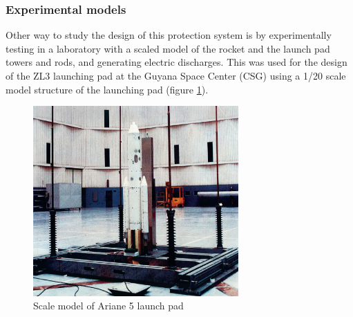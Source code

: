 \subsubsection{Experimental models}

Other way to study the design of this protection system is by experimentally testing
in a laboratory with a scaled model of the rocket and the launch pad towers and
rods, and generating electric discharges. This was used for the design of the ZL3
launching pad at the Guyana Space Center (CSG) using a 1/20 scale model structure
of the launching pad (figure \ref{fig:model_ariane}).

\begin{figure}[h!]
	\centering
	\includegraphics[width=0.7\textwidth]{img/model_ariane.png}
	\caption{Scale model of Ariane 5 launch pad}
	\label{fig:model_ariane}
\end{figure}

